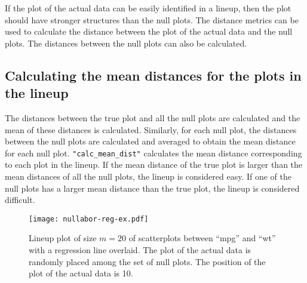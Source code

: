 If the plot of the actual data can be easily identified in a lineup, then the plot should have stronger structures than the null plots. The distance metrics can be used to calculate the distance between the plot of the actual data and the null plots. The distances between the null plots can also be calculated. 

\subsection{Calculating the mean distances for the plots in the
lineup}\label{calculating-the-mean-distances-for-the-plots-in-the-lineup}

The distances between the true
plot and all the null plots are calculated and the mean of these
distances is calculated. Similarly, for each null plot, the distances
between the null plots are calculated and
averaged to obtain the mean distance for each null plot.
\texttt{"calc\_mean\_dist"} calculates the mean distance corresponding
to each plot in the lineup. If the mean distance of the true plot is
larger than the mean distances of all the null plots, the lineup is
considered easy. If one of the null plots has a larger mean distance
than the true plot, the lineup is considered difficult.

\begin{figure*}[hbtp]
\begin{center}
\texttt{[image: nullabor-reg-ex.pdf]}
\caption{Lineup plot of size $m = 20$ of scatterplots between ``mpg'' and ``wt'' with a regression line overlaid. The plot of the actual data is randomly placed among the set of null plots. The position of the plot of the actual data is 10. }
\label{lineup-reg}
\end{center}
\end{figure*}

%

